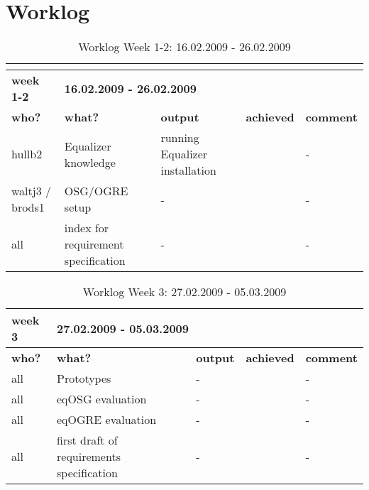 \chapter{Worklog}
\label{sec:appendixWorklog}

\begin{table}[H]
	\centering
	\begin{tabular}{|b{}|p{}|p{}|p{}|p{}|}
		\hline \multicolumn{2}{|l|}{\color{red}{\bfseries 16.02.2009}} & \multicolumn{3}{l|}{\color{red}{\bfseries Project Start}} \\
		\hline
		\hline \bfseries week 1-2 & \multicolumn{4}{l|}{\bfseries 16.02.2009 - 26.02.2009} \\
		\hline
		\hline \bfseries who? & \bfseries what? & \bfseries output & \bfseries achieved & \bfseries comment \\ 
		\hline hullb2 & Equalizer knowledge & running Equalizer installation & \tick & \quad\quad- \\
		\hline waltj3 / brods1 & OSG/OGRE setup & \quad\quad- & \tick & \quad\quad- \\
		\hline all & index for requirement specification & \quad\quad- & \tick & \quad\quad- \\ 
		\hline
	\end{tabular}
	\caption{Worklog Week 1-2: 16.02.2009 - 26.02.2009}
\end{table}

\begin{table}[H]
	\centering
	\begin{tabular}{|b{}|p{}|p{}|p{}|p{}|}
		\hline \bfseries week 3 & \multicolumn{4}{l|}{\bfseries 27.02.2009 - 05.03.2009} \\
		\hline
		\hline \bfseries who? & \bfseries what? & \bfseries output & \bfseries achieved & \bfseries comment \\ 
		\hline all & Prototypes & \quad\quad- & \tick & \quad\quad- \\
		\hline all & eqOSG evaluation & \quad\quad- & \tick & \quad\quad- \\
		\hline all & eqOGRE evaluation & \quad\quad- & \tick & \quad\quad- \\
		\hline all & first draft of requirements specification & \quad\quad- & \tick & \quad\quad- \\
		\hline
	\end{tabular}
	\caption{Worklog Week 3: 27.02.2009 - 05.03.2009}
\end{table}

